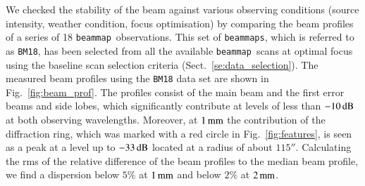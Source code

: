 \documentclass[traditionalabstract]{aa}
\newcommand{\bm}{{\tt beammap}}
\newcommand{\bms}{{\tt beammaps}}
\newcommand{\lp}[1]{#1}
\begin{document}
We checked the stability of the beam against various
observing conditions (source intensity, weather condition, focus
optimisation) by comparing the beam profiles of a series of 18 \bm\
observations.
This set of \bms, which is referred to as {\tt BM18}, has been
selected from all the available \bm\ scans at optimal focus using the
baseline scan selection criteria (Sect.~\ref{se:data_selection}).
The measured beam profiles using the {\tt BM18} data set are shown in
Fig.~\ref{fig:beam_prof}. {\lp The profiles consist of the main beam and
the first error beams and side lobes, which significantly contribute
at levels of less than $-10\,\rm{dB}$ at both observing
wavelengths. Moreover, at $1\,\rm{mm}$ the contribution of the
diffraction ring, which was marked with a red circle in Fig.~\ref{fig:features},
is seen as a peak at a level up to $-33\,\rm{dB}$ located at a radius
of about $115''$.} Calculating the {\lp rms of the relative}
difference of the beam profiles to the median beam profile, we find a
dispersion below $5\%$ at $1\,\rm{mm}$ and below $2\%$ at
$2\,\rm{mm}$.
\end{document}
